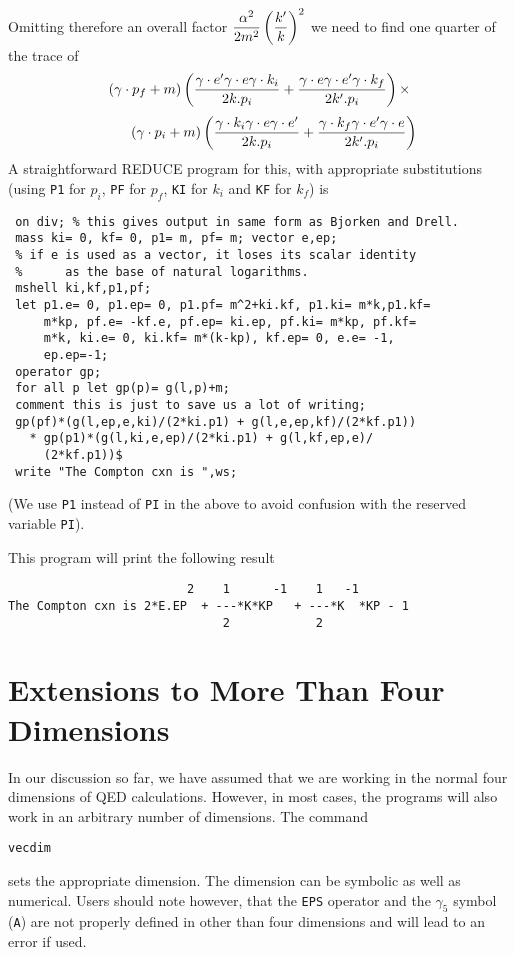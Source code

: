 Omitting therefore an overall factor
$\displaystyle\frac{\alpha^2}{2m^2}\left({k^\prime\over k}\right)^2$ we need to find one quarter of the trace of
\begin{displaymath}
 \left( \gamma\cdot p_f + m\right)
 \left({\gamma\cdot e^\prime \gamma\cdot e\gamma\cdot k_i\over2k.p_i} +
  {\gamma\cdot e\gamma\cdot e^\prime \gamma\cdot k_f\over 2k^\prime.p_i}\right)\times
\end{displaymath}
\begin{displaymath}
 \qquad\left(
  \gamma\cdot p_i + m\right)
 \left({\gamma\cdot k_i\gamma\cdot e\gamma\cdot e^\prime\over 2k.p_i} +
  {\gamma\cdot k_f\gamma\cdot e^\prime \gamma\cdot e\over2k^\prime.p_i}\right) 
\end{displaymath}
A straightforward REDUCE program for this, with appropriate substitutions
(using \texttt{P1} for $p_i$, \texttt{PF} for $p_f$, \texttt{KI}
for $k_i$ and \texttt{KF} for $k_f$) is
\begin{verbatim}
 on div; % this gives output in same form as Bjorken and Drell.
 mass ki= 0, kf= 0, p1= m, pf= m; vector e,ep;
 % if e is used as a vector, it loses its scalar identity
 %      as the base of natural logarithms.
 mshell ki,kf,p1,pf;
 let p1.e= 0, p1.ep= 0, p1.pf= m^2+ki.kf, p1.ki= m*k,p1.kf=
     m*kp, pf.e= -kf.e, pf.ep= ki.ep, pf.ki= m*kp, pf.kf=
     m*k, ki.e= 0, ki.kf= m*(k-kp), kf.ep= 0, e.e= -1,
     ep.ep=-1;
 operator gp;
 for all p let gp(p)= g(l,p)+m;
 comment this is just to save us a lot of writing;
 gp(pf)*(g(l,ep,e,ki)/(2*ki.p1) + g(l,e,ep,kf)/(2*kf.p1))
   * gp(p1)*(g(l,ki,e,ep)/(2*ki.p1) + g(l,kf,ep,e)/
     (2*kf.p1))$
 write "The Compton cxn is ",ws;
\end{verbatim}

(We use \texttt{P1} instead of \texttt{PI} in the above to avoid confusion with
the reserved variable \texttt{PI}).

This program will print the following result
\begin{verbatim}
                         2    1      -1    1   -1
The Compton cxn is 2*E.EP  + ---*K*KP   + ---*K  *KP - 1
                              2            2
\end{verbatim}

\section{Extensions to More Than Four Dimensions}
\hypertarget{command:VECDIM}{}

In our discussion so far, we have assumed that we are working in the
normal four dimensions of QED calculations. However, in most cases, the
programs will also work in an arbitrary number of dimensions. The command
\begin{syntax}
    \texttt{vecdim }
\end{syntax}
sets the appropriate dimension. The dimension can be symbolic as well as
numerical. Users should note however, that the \texttt{EPS} operator and the
$\gamma_{5}$ symbol (\texttt{A}) are not properly defined in other than four
dimensions and will lead to an error if used.

